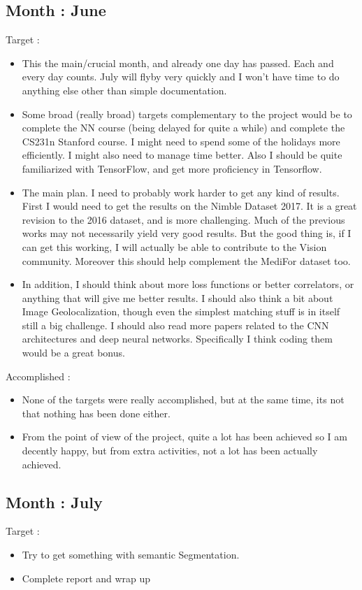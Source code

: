 \documentclass{article}
\begin{document}
\subsection{Month : June}
Target :
\begin{itemize}
\item This the main/crucial month, and already one day has passed. Each and every day counts. July will flyby very quickly and I won't have time to do anything else other than simple documentation.
\item Some broad (really broad) targets complementary to the project would be to complete the NN course (being delayed for quite a while) and complete the CS231n Stanford course. I might need to spend some of the holidays more efficiently. I might also need to manage time better. Also I should be quite familiarized with TensorFlow, and get more proficiency in Tensorflow.
\item The main plan. I need to probably work harder to get any kind of results. First I would need to get the results on the Nimble Dataset 2017. It is a great revision to the 2016 dataset, and is more challenging. Much of the previous works may not necessarily yield very good results. But the good thing is, if I can get this working, I will actually be able to contribute to the Vision community. Moreover this should help complement the MediFor dataset too.
\item In addition, I should think about more loss functions or better correlators, or anything that will give me better results. I should also think a bit about Image Geolocalization, though even the simplest matching stuff is in itself still a big challenge. I should also read more papers related to the CNN architectures and deep neural networks. Specifically I think coding them would be a great bonus.
\end{itemize}

Accomplished :
\begin{itemize}
\item None of the targets were really accomplished, but at the same time, its not that nothing has been done either.
\item From the point of view of the project, quite a lot has been achieved so I am decently happy, but from extra activities, not a lot has been actually achieved.
\end{itemize}

\subsection{Month : July}
Target :
\begin{itemize}
\item Try to get something with semantic Segmentation.
\item Complete report and wrap up
\end{itemize}
\end{document}
